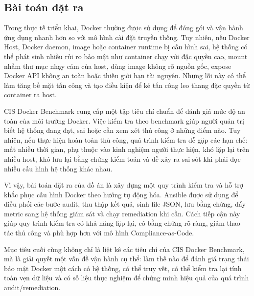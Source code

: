 \subsection{Bài toán đặt ra}\label{bai-toan-dat-ra}

Trong thực tế triển khai, Docker thường được sử dụng để đóng gói và vận hành ứng dụng nhanh hơn so với mô hình cài đặt truyền thống. Tuy nhiên, nếu Docker Host, Docker daemon, image hoặc container runtime bị cấu hình sai, hệ thống có thể phát sinh nhiều rủi ro bảo mật như container chạy với đặc quyền cao, mount nhầm thư mục nhạy cảm của host, dùng image không rõ nguồn gốc, expose Docker API không an toàn hoặc thiếu giới hạn tài nguyên. Những lỗi này có thể làm tăng bề mặt tấn công và tạo điều kiện để kẻ tấn công leo thang đặc quyền từ container ra host.

CIS Docker Benchmark cung cấp một tập tiêu chí chuẩn để đánh giá mức độ an toàn của môi trường Docker. Việc kiểm tra theo benchmark giúp người quản trị biết hệ thống đang đạt, sai hoặc cần xem xét thủ công ở những điểm nào. Tuy nhiên, nếu thực hiện hoàn toàn thủ công, quá trình kiểm tra dễ gặp các hạn chế: mất nhiều thời gian, phụ thuộc vào kinh nghiệm người thực hiện, khó lặp lại trên nhiều host, khó lưu lại bằng chứng kiểm toán và dễ xảy ra sai sót khi phải đọc nhiều cấu hình hệ thống khác nhau.

Vì vậy, bài toán đặt ra của đồ án là xây dựng một quy trình kiểm tra và hỗ trợ khắc phục cấu hình Docker theo hướng tự động hóa. Ansible được sử dụng để điều phối các bước audit, thu thập kết quả, sinh file JSON, lưu bằng chứng, đẩy metric sang hệ thống giám sát và chạy remediation khi cần. Cách tiếp cận này giúp quy trình kiểm tra có khả năng lặp lại, có bằng chứng rõ ràng, giảm thao tác thủ công và phù hợp hơn với mô hình Compliance-as-Code.

Mục tiêu cuối cùng không chỉ là liệt kê các tiêu chí của CIS Docker Benchmark, mà là giải quyết một vấn đề vận hành cụ thể: làm thế nào để đánh giá trạng thái bảo mật Docker một cách có hệ thống, có thể truy vết, có thể kiểm tra lại tính toàn vẹn dữ liệu và có số liệu thực nghiệm để chứng minh hiệu quả của quá trình audit/remediation.
